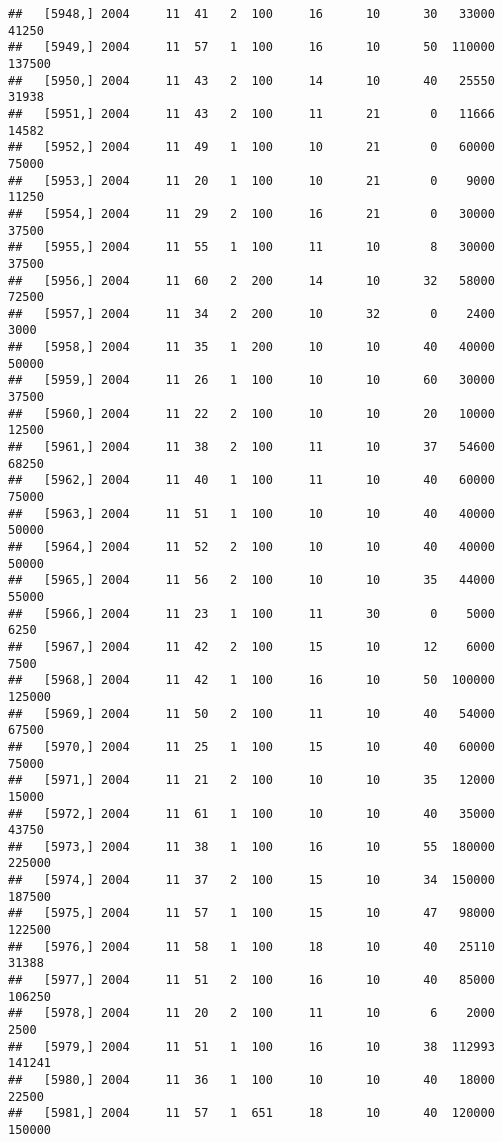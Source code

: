\documentclass{article}\usepackage[]{graphicx}\usepackage[]{color}
\makeatletter
\newenvironment{kframe}{%
 \def\at@end@of@kframe{}%
 \ifinner\ifhmode%
  \def\at@end@of@kframe{\end{minipage}}%
  \begin{minipage}{\columnwidth}%
 \fi\fi%
 \def\FrameCommand##1{\hskip\@totalleftmargin \hskip-\fboxsep
 \colorbox{shadecolor}{##1}\hskip-\fboxsep
     \hskip-\linewidth \hskip-\@totalleftmargin \hskip\columnwidth}%
 \MakeFramed {\advance\hsize-\width
   \@totalleftmargin\z@ \linewidth\hsize
   \@setminipage}}%
 {\par\unskip\endMakeFramed%
 \at@end@of@kframe}
\newenvironment{knitrout}{}{} %
\makeatother
\begin{document}
\begin{knitrout}
\begin{kframe}
\begin{verbatim}
##   [5948,] 2004     11  41   2  100     16      10      30   33000   41250
##   [5949,] 2004     11  57   1  100     16      10      50  110000  137500
##   [5950,] 2004     11  43   2  100     14      10      40   25550   31938
##   [5951,] 2004     11  43   2  100     11      21       0   11666   14582
##   [5952,] 2004     11  49   1  100     10      21       0   60000   75000
##   [5953,] 2004     11  20   1  100     10      21       0    9000   11250
##   [5954,] 2004     11  29   2  100     16      21       0   30000   37500
##   [5955,] 2004     11  55   1  100     11      10       8   30000   37500
##   [5956,] 2004     11  60   2  200     14      10      32   58000   72500
##   [5957,] 2004     11  34   2  200     10      32       0    2400    3000
##   [5958,] 2004     11  35   1  200     10      10      40   40000   50000
##   [5959,] 2004     11  26   1  100     10      10      60   30000   37500
##   [5960,] 2004     11  22   2  100     10      10      20   10000   12500
##   [5961,] 2004     11  38   2  100     11      10      37   54600   68250
##   [5962,] 2004     11  40   1  100     11      10      40   60000   75000
##   [5963,] 2004     11  51   1  100     10      10      40   40000   50000
##   [5964,] 2004     11  52   2  100     10      10      40   40000   50000
##   [5965,] 2004     11  56   2  100     10      10      35   44000   55000
##   [5966,] 2004     11  23   1  100     11      30       0    5000    6250
##   [5967,] 2004     11  42   2  100     15      10      12    6000    7500
##   [5968,] 2004     11  42   1  100     16      10      50  100000  125000
##   [5969,] 2004     11  50   2  100     11      10      40   54000   67500
##   [5970,] 2004     11  25   1  100     15      10      40   60000   75000
##   [5971,] 2004     11  21   2  100     10      10      35   12000   15000
##   [5972,] 2004     11  61   1  100     10      10      40   35000   43750
##   [5973,] 2004     11  38   1  100     16      10      55  180000  225000
##   [5974,] 2004     11  37   2  100     15      10      34  150000  187500
##   [5975,] 2004     11  57   1  100     15      10      47   98000  122500
##   [5976,] 2004     11  58   1  100     18      10      40   25110   31388
##   [5977,] 2004     11  51   2  100     16      10      40   85000  106250
##   [5978,] 2004     11  20   2  100     11      10       6    2000    2500
##   [5979,] 2004     11  51   1  100     16      10      38  112993  141241
##   [5980,] 2004     11  36   1  100     10      10      40   18000   22500
##   [5981,] 2004     11  57   1  651     18      10      40  120000  150000

\end{verbatim}
\end{kframe}
\end{knitrout}
\end{document}
